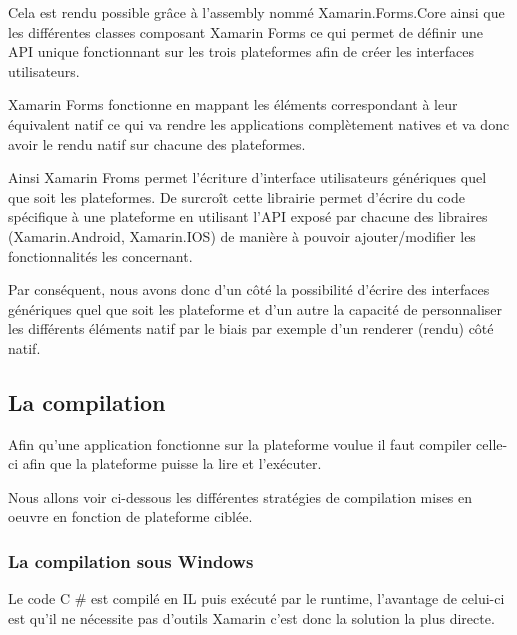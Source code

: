 \documentclass[11]{article}
\begin{document}
 \vspace{0.5cm}
 
Cela est rendu possible grâce à l’assembly nommé Xamarin.Forms.Core ainsi que les différentes  classes composant  Xamarin Forms ce qui permet de définir une API unique fonctionnant sur les trois plateformes afin de créer les interfaces utilisateurs.

 \vspace{0.5cm}
 
Xamarin Forms fonctionne en mappant les éléments correspondant à leur équivalent natif ce qui va rendre les applications complètement natives et va donc avoir le rendu natif sur chacune des plateformes.
 
 \vspace{0.5cm}
 
Ainsi Xamarin Froms permet l'écriture d’interface utilisateurs génériques quel que soit les plateformes. De surcroît cette librairie permet d’écrire du code spécifique à une plateforme en utilisant l’API exposé par chacune des libraires (Xamarin.Android, Xamarin.IOS) de manière à pouvoir ajouter/modifier les fonctionnalités les concernant.
 
 \vspace{0.5cm}
 
Par conséquent, nous avons donc d’un côté la possibilité d'écrire des interfaces génériques quel que soit les plateforme et d’un autre la capacité de personnaliser les différents éléments natif par le biais par exemple d’un renderer (rendu) côté natif.


\subsection{La compilation}

Afin qu’une application fonctionne sur la plateforme voulue il faut compiler celle-ci afin que la plateforme puisse la lire et l'exécuter.
 
 \vspace{0.5cm}
 
Nous allons voir ci-dessous les différentes stratégies de compilation mises en oeuvre en fonction de plateforme ciblée.

\subsubsection{La compilation sous Windows}

Le code C # est compilé en IL puis exécuté par le runtime, l’avantage de celui-ci est qu’il ne nécessite pas d'outils Xamarin c’est donc la solution la plus directe.
\end{document}
